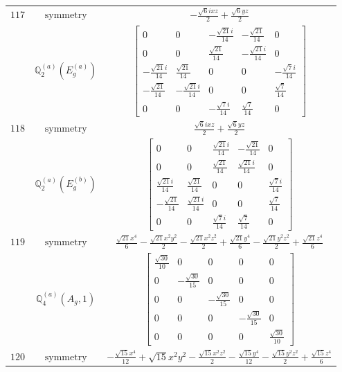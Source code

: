 \documentclass[fleqn,8pt,landscape]{jsarticle}
\begin{document}
\begin{longtable}{ccc}
$ 117 $ & $ \text{symmetry} $ & $ - \frac{\sqrt{6} i x z}{2} + \frac{\sqrt{6} y z}{2} $ \\
$  $ & $ \mathbb{Q}_{2}^{(a)}(E_{g}^{(a)}) $ & $ \begin{bmatrix} 0 & 0 & - \frac{\sqrt{21} i}{14} & - \frac{\sqrt{21}}{14} & 0 \\ 0 & 0 & \frac{\sqrt{21}}{14} & - \frac{\sqrt{21} i}{14} & 0 \\ - \frac{\sqrt{21} i}{14} & \frac{\sqrt{21}}{14} & 0 & 0 & - \frac{\sqrt{7} i}{14} \\ - \frac{\sqrt{21}}{14} & - \frac{\sqrt{21} i}{14} & 0 & 0 & \frac{\sqrt{7}}{14} \\ 0 & 0 & - \frac{\sqrt{7} i}{14} & \frac{\sqrt{7}}{14} & 0 \end{bmatrix} $ \\ \hline
$ 118 $ & $ \text{symmetry} $ & $ \frac{\sqrt{6} i x z}{2} + \frac{\sqrt{6} y z}{2} $ \\
$  $ & $ \mathbb{Q}_{2}^{(a)}(E_{g}^{(b)}) $ & $ \begin{bmatrix} 0 & 0 & \frac{\sqrt{21} i}{14} & - \frac{\sqrt{21}}{14} & 0 \\ 0 & 0 & \frac{\sqrt{21}}{14} & \frac{\sqrt{21} i}{14} & 0 \\ \frac{\sqrt{21} i}{14} & \frac{\sqrt{21}}{14} & 0 & 0 & \frac{\sqrt{7} i}{14} \\ - \frac{\sqrt{21}}{14} & \frac{\sqrt{21} i}{14} & 0 & 0 & \frac{\sqrt{7}}{14} \\ 0 & 0 & \frac{\sqrt{7} i}{14} & \frac{\sqrt{7}}{14} & 0 \end{bmatrix} $ \\ \hline
$ 119 $ & $ \text{symmetry} $ & $ \frac{\sqrt{21} x^{4}}{6} - \frac{\sqrt{21} x^{2} y^{2}}{2} - \frac{\sqrt{21} x^{2} z^{2}}{2} + \frac{\sqrt{21} y^{4}}{6} - \frac{\sqrt{21} y^{2} z^{2}}{2} + \frac{\sqrt{21} z^{4}}{6} $ \\
$  $ & $ \mathbb{Q}_{4}^{(a)}(A_{g},1) $ & $ \begin{bmatrix} \frac{\sqrt{30}}{10} & 0 & 0 & 0 & 0 \\ 0 & - \frac{\sqrt{30}}{15} & 0 & 0 & 0 \\ 0 & 0 & - \frac{\sqrt{30}}{15} & 0 & 0 \\ 0 & 0 & 0 & - \frac{\sqrt{30}}{15} & 0 \\ 0 & 0 & 0 & 0 & \frac{\sqrt{30}}{10} \end{bmatrix} $ \\ \hline
$ 120 $ & $ \text{symmetry} $ & $ - \frac{\sqrt{15} x^{4}}{12} + \sqrt{15} x^{2} y^{2} - \frac{\sqrt{15} x^{2} z^{2}}{2} - \frac{\sqrt{15} y^{4}}{12} - \frac{\sqrt{15} y^{2} z^{2}}{2} + \frac{\sqrt{15} z^{4}}{6} $ \\

\end{longtable}
\end{document}
